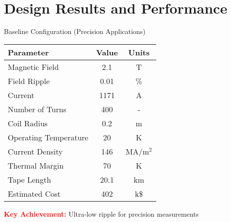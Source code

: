 \documentclass[aspectratio=169,xcolor={table,dvipsnames}]{beamer}
\newcommand{\highlight}[1]{\textcolor{red}{\textbf{#1}}}
\begin{document}
\section{Design Results and Performance}

\begin{frame}{Baseline Configuration (Precision Applications)}
    \begin{table}[h]
        \centering
        \begin{tabular}{lcc}
            \toprule
            \textbf{Parameter} & \textbf{Value} & \textbf{Units} \\
            \midrule
            Magnetic Field & 2.1 & T \\
            Field Ripple & 0.01 & \% \\
            Current & 1171 & A \\
            Number of Turns & 400 & - \\
            Coil Radius & 0.2 & m \\
            Operating Temperature & 20 & K \\
            Current Density & 146 & MA/m$^2$ \\
            Thermal Margin & 70 & K \\
            Tape Length & 20.1 & km \\
            Estimated Cost & 402 & k\$ \\
            \bottomrule
        \end{tabular}
    \end{table}
    
    \highlight{Key Achievement:} Ultra-low ripple for precision measurements
\end{frame}
\end{document}
